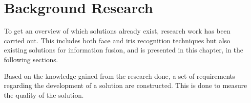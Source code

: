 \chapter{Background Research}
\label{cha:Research}
To get an overview of which solutions already exist, research work has been carried out. This includes both face and iris recognition techniques but also existing solutions for information fusion, and is presented in this chapter, in the following sections.




Based on the knowledge gained from the research done, a set of requirements regarding the development of a solution are constructed. This is done to measure the quality of the solution.